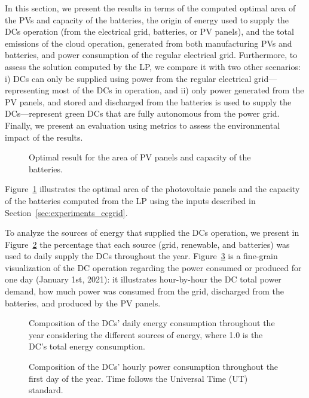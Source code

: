 In this section, we present the results in terms of the computed optimal area of the PVs and capacity of the batteries, the origin of energy used to supply the DCs operation (from the electrical grid, batteries, or PV panels), and the total emissions of the cloud operation, generated from both manufacturing PVs and batteries, and power consumption of the regular electrical grid. Furthermore, to assess the solution computed by the LP, we compare it with two other scenarios: i) DCs can only be supplied using power from the regular electrical grid---representing most of the DCs in operation, and ii) only power generated from the PV panels, and stored and discharged from the batteries is used to supply the DCs---represent green DCs that are fully autonomous from the power grid. Finally, we present an evaluation using metrics to assess the environmental impact of the results.

\begin{figure}[h]
  \centering
  {}
  \caption{Optimal result for the area of PV panels and capacity of the batteries.}
  \label{fig:sizing}
\end{figure}

Figure~\ref{fig:sizing} illustrates the optimal area of the photovoltaic panels and the capacity of the batteries computed from the LP using the inputs described in Section~\ref{sec:experiments_ccgrid}.

To analyze the sources of energy that supplied the DCs operation, we present in Figure~\ref{fig:energy_ratio_daily} the percentage that each source (grid, renewable, and batteries) was used to daily supply the DCs throughout the year. Figure~\ref{fig:power_ratio_hourly} is a fine-grain visualization of the DC operation regarding the power consumed or produced for one day (January 1st, 2021): it illustrates hour-by-hour the DC total power demand, how much power was consumed from the grid, discharged from the batteries, and produced by the PV panels.
 

\begin{figure}[h]
  \centering
   {}
  \caption{Composition of the DCs' daily energy consumption throughout the year considering the different sources of energy, where 1.0 is the DC's total energy consumption.}
  \label{fig:energy_ratio_daily}
\end{figure}




 \begin{figure}[h]
  \centering
   {}
  \caption{Composition of the DCs' hourly power consumption throughout the first day of the year. Time follows the Universal Time (UT) standard.}
  \label{fig:power_ratio_hourly}
\end{figure}

